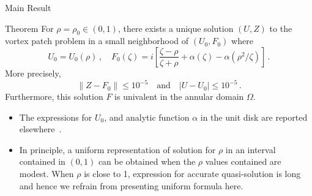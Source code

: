 \begin{block}{Main Result}
  \begin{alertblock}{Theorem}
    \label{thm:main}
    For $\rho = \rho_0 \in (0,1)$, there exists a unique solution
    $(U, Z) $ to the vortex patch problem in a small neighborhood of
    $(U_{0}, F_{0})$ where
    \begin{equation}
      \label{eq:41}
      U_{0} = U_0 (\rho)\,, \quad
      F_{0}(\zeta) = i \left[
        \frac{\zeta - \rho}{\zeta + \rho}
        + \alpha(\zeta) - \alpha(\rho^{2}/\zeta) \right] \,.
    \end{equation}
    More precisely,
    \begin{equation}
      \label{eq:thm-error}
      \| Z - F_{0} \| \le 10^{-5} \quad \mbox{and} \quad
      \left| U - U_{0} \right| \le 10^{-5} \,.
    \end{equation}
    Furthermore, this solution $F$ is univalent in the annular domain
    $\Omega$.
  \end{alertblock}

  \begin{itemize}
  \item The expressions for $U_0 $, and analytic function $\alpha$ in the
    unit disk are reported elsewhere~\cite{tk-thesis}.
  \item In principle, a uniform representation of solution for $\rho$ in
    an interval contained in $(0,1)$ can be obtained when the $\rho$
    values contained are modest. When $\rho$ is close to 1, expression
    for accurate quasi-solution is long and hence we refrain from
    presenting uniform formula here.
  \end{itemize}
\end{block}

